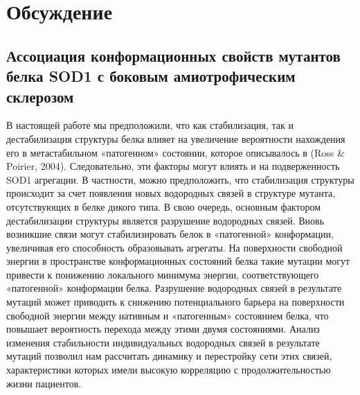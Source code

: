 \chapter{Обсуждение} \label{chapt4}

\section{Ассоциация конформационных свойств мутантов белка SOD1 с боковым амиотрофическим склерозом} \label{sect_SOD1_mutations}

В настоящей работе мы предположили, что как стабилизация, так и дестабилизация структуры белка влияет на увеличение вероятности нахождения его в метастабильном «патогенном» состоянии, которое описывалось в (Ross \& Poirier, 2004). Следовательно, эти факторы могут влиять и на подверженность SOD1 агрегации. В частности, можно предположить, что стабилизация структуры происходит за счет появления новых водородных связей в структуре мутанта, отсутствующих в белке дикого типа. В свою очередь, основным фактором дестабилизации структуры является разрушение водородных связей. Вновь возникшие связи могут стабилизировать белок в «патогенной» конформации, увеличивая его способность образовывать агрегаты. На поверхности свободной энергии в пространстве конформационных состояний белка такие мутации могут привести к понижению локального минимума энергии, соответствующего «патогенной» конформации белка. Разрушение водородных связей в результате мутаций может приводить к снижению потенциального барьера на поверхности свободной энергии между нативным и «патогенным» состоянием белка, что повышает вероятность перехода между этими двумя состояниями.
Анализ изменения стабильности индивидуальных водородных связей в результате мутаций позволил нам рассчитать динамику и перестройку сети этих связей, характеристики которых имели высокую корреляцию с продолжительностью жизни пациентов. 

